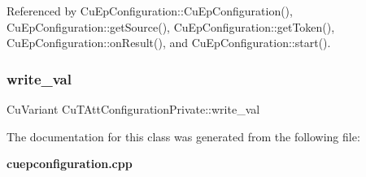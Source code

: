 Referenced by Cu\+Ep\+Configuration\+::\+Cu\+Ep\+Configuration(), Cu\+Ep\+Configuration\+::get\+Source(), Cu\+Ep\+Configuration\+::get\+Token(), Cu\+Ep\+Configuration\+::on\+Result(), and Cu\+Ep\+Configuration\+::start().

\mbox{\label{classCuTAttConfigurationPrivate_a052c84c0a9d5d0e9615ee0bf1434b8a3}} 
\subsubsection{write\+\_\+val}
{\footnotesize\ttfamily Cu\+Variant Cu\+T\+Att\+Configuration\+Private\+::write\+\_\+val}



The documentation for this class was generated from the following file\+:\begin{DoxyCompactItemize}
\item 
\textbf{ cuepconfiguration.\+cpp}\end{DoxyCompactItemize}
